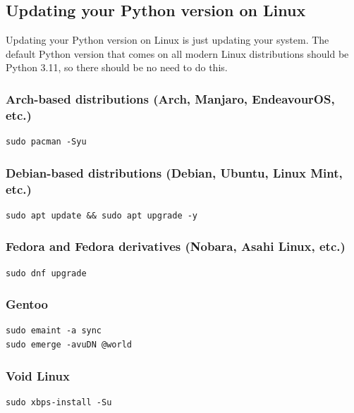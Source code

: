 \documentclass[11pt]{article}
\begin{document}
 \newpage

\subsection{Updating your Python version on Linux}
\label{sec:org54abb90}
Updating your Python version on Linux is just updating your system. The default Python version that comes on all modern Linux distributions should be Python 3.11, so there should be no need to do this.

\subsubsection{Arch-based distributions (Arch, Manjaro, EndeavourOS, etc.)}
\label{sec:org7decb65}
\begin{verbatim}
sudo pacman -Syu
\end{verbatim}

\subsubsection{Debian-based distributions (Debian, Ubuntu, Linux Mint, etc.)}
\label{sec:org9a3bdbf}
\begin{verbatim}
sudo apt update && sudo apt upgrade -y
\end{verbatim}

\subsubsection{Fedora and Fedora derivatives (Nobara, Asahi Linux, etc.)}
\label{sec:orgb8a185c}
\begin{verbatim}
sudo dnf upgrade
\end{verbatim}

\subsubsection{Gentoo}
\label{sec:orge65a103}
\begin{verbatim}
sudo emaint -a sync
sudo emerge -avuDN @world
\end{verbatim}

\subsubsection{Void Linux}
\label{sec:org2a57842}
\begin{verbatim}
sudo xbps-install -Su
\end{verbatim}
\end{document}

